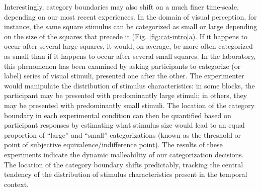 \documentclass[a4paper, nobind]{templates/ociamthesis}
\begin{document}
Interestingly, category boundaries may also shift on a much finer time-scale, depending on our most recent experiences. In the domain of visual perception, for instance, the same square stimulus can be categorized as small or large depending on the size of the squares that precede it (Fig. \ref{fig:cat-intro}a). If it happens to occur after several large squares, it would, on average, be more often categorized as small than if it happens to occur after several small squares. In the laboratory, this phenomenon has been examined by asking participants to categorize (or label) series of visual stimuli, presented one after the other. The experimenter would manipulate the distribution of stimulus characteristics: in some blocks, the participant may be presented with predominantly large stimuli; in others, they may be presented with predominantly small stimuli. The location of the category boundary in each experimental condition can then be quantified based on participant responses by estimating what stimulus size would lead to an equal proportion of ``large'' and ``small'' categorizations (known as the threshold or point of subjective equivalence/indifference point). The results of these experiments indicate the dynamic malleability of our categorization decisions. The location of the category boundary shifts predictably, tracking the central tendency of the distribution of stimulus characteristics present in the temporal context.
\end{document}
